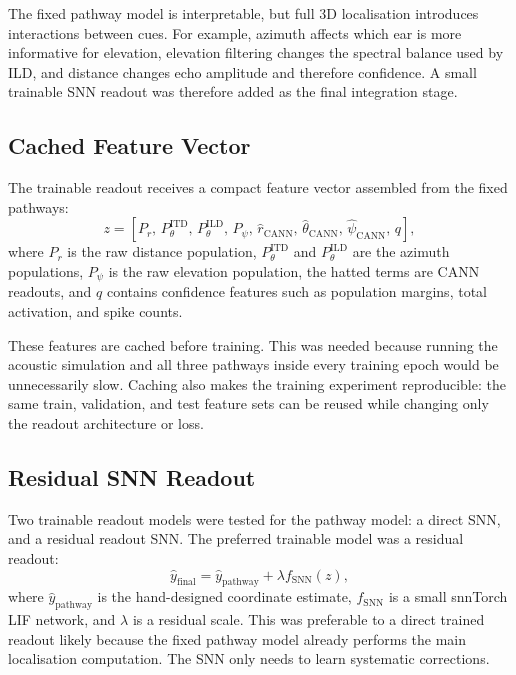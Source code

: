 The fixed pathway model is interpretable, but full 3D localisation introduces interactions between cues. For example, azimuth affects which ear is more informative for elevation, elevation filtering changes the spectral balance used by ILD, and distance changes echo amplitude and therefore confidence. A small trainable SNN readout was therefore added as the final integration stage.


\subsection{Cached Feature Vector}

The trainable readout receives a compact feature vector assembled from the fixed pathways:
\begin{equation}
    z =
    \left[
    P_r,\,
    P^{\text{ITD}}_{\theta},\,
    P^{\text{ILD}}_{\theta},\,
    P_{\psi},\,
    \hat{r}_{\text{CANN}},\,
    \hat{{\theta}}_{\text{CANN}},\,
    \hat{{\psi}}_{\text{CANN}},\,
    q
    \right],
\end{equation}
where $P_r$ is the raw distance population, $P^{\text{ITD}}_{\theta}$ and $P^{\text{ILD}}_{\theta}$ are the azimuth populations, $P_{\psi}$ is the raw elevation population, the hatted terms are CANN readouts, and $q$ contains confidence features such as population margins, total activation, and spike counts.

These features are cached before training. This was needed because running the acoustic simulation and all three pathways inside every training epoch would be unnecessarily slow. Caching also makes the training experiment reproducible: the same train, validation, and test feature sets can be reused while changing only the readout architecture or loss.

\subsection{Residual SNN Readout}

Two trainable readout models were tested for the pathway model: a direct SNN, and a residual readout SNN. The preferred trainable model was a residual readout:
\begin{equation}
    \hat{y}_{\text{final}} = \hat{y}_{\text{pathway}} + \lambda f_{\text{SNN}}(z),
\end{equation}
where $\hat{y}_{\text{pathway}}$ is the hand-designed coordinate estimate, $f_{\text{SNN}}$ is a small snnTorch LIF network, and $\lambda$ is a residual scale. This was preferable to a direct trained readout likely because the fixed pathway model already performs the main localisation computation. The SNN only needs to learn systematic corrections.

